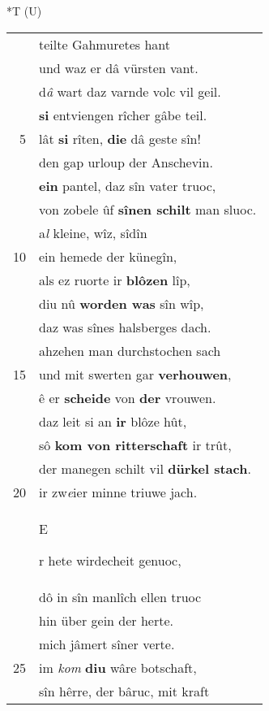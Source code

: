 \documentclass[8pt,a4paper,notitlepage]{article}
\begin{document}
\begin{table}[ht]
\begin{minipage}[t]{0.5\linewidth}
\end{minipage}
\hspace{0.5cm}
\begin{minipage}[t]{0.5\linewidth}
\small
\begin{center}*T (U)
\end{center}
\begin{tabular}{rl}
 & teilte Gahmuretes hant\\ 
 & und waz er dâ vürsten vant.\\ 
 & d\textit{â} wart daz varnde volc vil geil.\\ 
 & \textbf{si} entviengen rîcher gâbe teil.\\ 
5 & lât \textbf{si} rîten, \textbf{die} dâ geste sîn!\\ 
 & den gap urloup der Anschevin.\\ 
 & \textbf{ein} pantel, daz sîn vater truoc,\\ 
 & von zobele ûf \textbf{sînen schilt} man sluoc.\\ 
 & a\textit{l} kleine, wîz, sîdîn\\ 
10 & ein hemede der künegîn,\\ 
 & als ez ruorte ir \textbf{blôzen} lîp,\\ 
 & diu nû \textbf{worden was} sîn wîp,\\ 
 & daz was sînes halsberges dach.\\ 
 & ahzehen man durchstochen sach\\ 
15 & und mit swerten gar \textbf{verhouwen},\\ 
 & ê er \textbf{scheide} von \textbf{der} vrouwen.\\ 
 & daz leit si an \textbf{ir} blôze hût,\\ 
 & sô \textbf{kom von ritterschaft} ir trût,\\ 
 & der manegen schilt vil \textbf{dürkel stach}.\\ 
20 & ir zw\textit{e}ier minne triuwe jach.\\ 
 & \begin{large}E\end{large}r hete wirdecheit genuoc,\\ 
 & dô in sîn manlîch ellen truoc\\ 
 & hin über gein der herte.\\ 
 & mich jâmert sîner verte.\\ 
25 & im \textit{kom} \textbf{diu} wâre botschaft,\\ 
 & sîn hêrre, der bâruc, mit kraft\\ 

\end{tabular}
\end{minipage}
\end{table}
\end{document}
